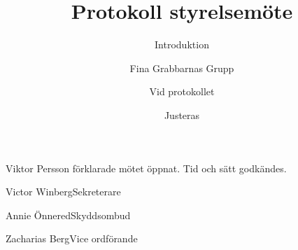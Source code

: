 \documentclass{fgg}
\title{Protokoll styrelsemöte}
\subtitle{Introduktion}
\author{Fina Grabbarnas Grupp}
\date{\formatdate{1}{1}{1970}}
\begin{document}
\makehf
\maketitle

\begin{narvaro}
\end{narvaro}

\begin{protokoll}
  Viktor Persson förklarade mötet öppnat.
  Tid och sätt godkändes.
\end{protokoll}


\signature{Vid protokollet}{Victor Winberg}{Sekreterare}
\signature{}{Annie Önnered}{Skyddsombud}
\signature{Justeras}{Zacharias Berg}{Vice ordförande}
\end{document}
